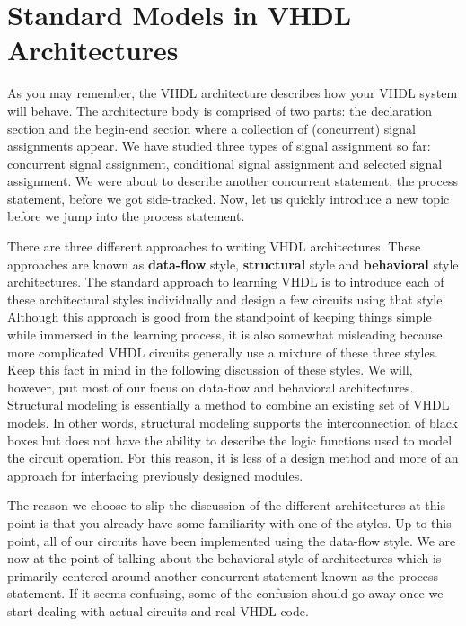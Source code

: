 %
%
%
\chapter{Standard Models in VHDL Architectures}
As you may remember, the VHDL architecture describes how your VHDL system will behave. The architecture body is comprised of two parts: the declaration section and the begin-end section where a collection of (concurrent) signal assignments appear. We have studied three types of signal assignment so far: concurrent signal assignment, conditional signal assignment and selected signal assignment. We were about to describe another concurrent statement, the process statement, before we got side-tracked. Now, let us quickly introduce a new topic before we jump into the process statement.

There are three different approaches to writing VHDL architectures. These approaches are known as \textbf{data-flow} style, \textbf{structural} style and \textbf{behavioral} style architectures. The standard approach to learning VHDL is to introduce each of these architectural styles individually and design a few circuits using that style. Although this approach is good from the standpoint of keeping things simple while immersed in the learning process, it is also somewhat misleading because more complicated VHDL circuits generally use a mixture of these three styles. Keep this fact in mind in the following discussion of these styles. We will, however, put most of our focus on data-flow and behavioral architectures. Structural modeling is essentially a method to combine an existing set of VHDL models. In other words, structural modeling supports the interconnection of black boxes but does not have the ability to describe the logic functions used to model the circuit operation. For this reason, it is less of a design method and more of an approach for interfacing previously designed modules.

The reason we choose to slip the discussion of the different architectures at this point is that you already have some familiarity with one of the styles. Up to this point, all of our circuits have been implemented using the data-flow style. We are now at the point of talking about the behavioral style of architectures which is primarily centered around another concurrent statement known as the process statement. If it seems confusing, some of the confusion should go away once we start dealing with actual circuits and real VHDL code.

